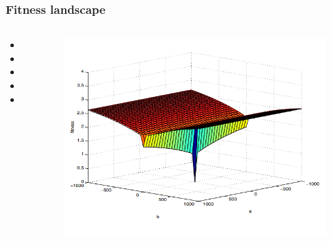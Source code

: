 \begin{frame}
	\frametitle{Fitness landscape}
	
	\begin{columns}[c]
		

		\begin{itemize}
			\item 
			\item 
			\item
			\item
			\item
		\end{itemize}
		
		\begin{figure}
			\includegraphics[width=1\textwidth]{figures/complex_landscape}
		\end{figure}
		
		
	\end{columns}
	
\end{frame}

